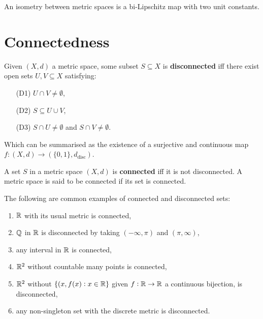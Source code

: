 \documentclass[../Year2.tex]{subfiles}
\begin{document}
\begin{remark}
    An isometry between metric spaces is a bi-Lipschitz map with two unit constants.
\end{remark}

\section{Connectedness}

\begin{definition}
    Given $(X,d)$ a metric space, some subset $S\subseteq X$ is \textbf{disconnected} iff there exist open sets $U,V\subseteq X$ satisfying: \begin{enumerate}
        \item[(D1)] $U\cap V \neq \emptyset$,
        \item[(D2)] $S\subseteq U\cup V$,
        \item[(D3)] $S\cap U \neq \emptyset$ and $S\cap V\neq\emptyset$.
    \end{enumerate}
    Which can be summarised as the existence of a surjective and continuous map $f:(X,d)\rightarrow(\{0,1\},d_{\text{disc}})$.
\end{definition}

\begin{definition}
    A set $S$ in a metric space $(X,d)$ is \textbf{connected} iff it is not disconnected. A metric space is said to be connected if its set is connected.
\end{definition}

\begin{examples} The following are common examples of connected and disconnected sets:
    \begin{enumerate}
        \item $\mathbb{R}$ with its usual metric is connected,
        \item $\mathbb{Q}$ in $\mathbb{R}$ is disconnected by taking $(-\infty,\pi)$ and $(\pi,\infty)$,
        \item any interval in $\mathbb{R}$ is connected,
        \item $\mathbb{R}^2$ without countable many points is connected,
        \item $\mathbb{R}^2$ without $\{(x,f(x):x\in\mathbb{R}\}$ given $f:\mathbb{R}\rightarrow\mathbb{R}$ a continuous bijection, is disconnected,
        \item any non-singleton set with the discrete metric is disconnected.
    \end{enumerate}
\end{examples}
\end{document}
